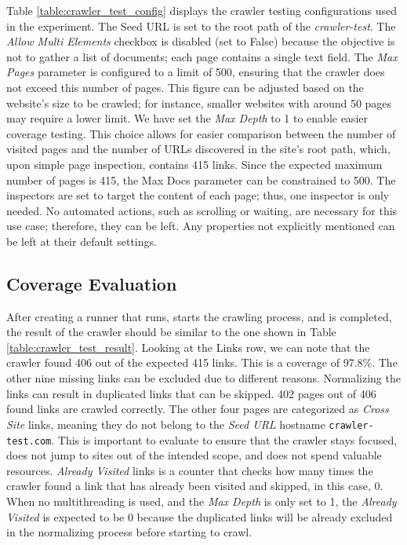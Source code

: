 {Table \ref{table:crawler_test_config} displays the crawler testing configurations used in the experiment. The Seed URL is set to the root path of the \textit{crawler-test}. The \textit{Allow Multi Elements} checkbox is disabled (set to False) because the objective is not to gather a list of documents; each page contains a single text field. The \textit{Max Pages} parameter is configured to a limit of 500, ensuring that the crawler does not exceed this number of pages. This figure can be adjusted based on the website's size to be crawled; for instance, smaller websites with around 50 pages may require a lower limit.
We have set the \textit{Max Depth} to 1 to enable easier coverage testing. This choice allows for easier comparison between the number of visited pages and the number of URLs discovered in the site's root path, which, upon simple page inspection, contains 415 links. Since the expected maximum number of pages is 415, the Max Docs parameter can be constrained to 500.
The inspectors are set to target the content of each page; thus, one inspector is only needed. No automated actions, such as scrolling or waiting, are necessary for this use case; therefore, they can be left. Any properties not explicitly mentioned can be left at their default settings.


\subsection*{Coverage Evaluation}
After creating a runner that runs, starts the crawling process, and is completed, the result of the crawler should be similar to the one shown in Table \ref{table:crawler_test_result}. Looking at the Links row, we can note that the crawler found 406 out of the expected 415 links. This is a coverage of 97.8\%. The other nine missing links can be excluded due to different reasons. Normalizing the links can result in duplicated links that can be skipped. 402 pages out of 406 found links are crawled correctly. The other four pages are categorized as \textit{Cross Site} links, meaning they do not belong to the \textit{Seed URL} hostname \texttt{crawler-test.com}. This is important to evaluate to ensure that the crawler stays focused, does not jump to sites out of the intended scope, and does not spend valuable resources. \textit{Already Visited} links is a counter that checks how many times the crawler found a link that has already been visited and skipped, in this case, 0. When no multithreading is used, and the \textit{Max Depth} is only set to 1, the \textit{Already Visited} is expected to be 0 because the duplicated links will be already excluded in the normalizing process before starting to crawl. 


}
